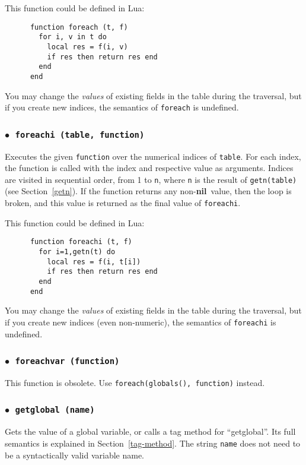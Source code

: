\documentclass[11pt]{article}
\newcommand{\See}[1]{Section~\ref{#1}}
\newcommand{\see}[1]{(see \See{#1})}
\newcommand{\T}[1]{{\tt #1}}
\newcommand{\nil}{{\bf nil}}
\newcommand{\Deffunc}[1]{\index{#1}}
\newcommand{\ff}{$\bullet$\ }
\begin{document}
This function could be defined in Lua:
\begin{verbatim}
      function foreach (t, f)
        for i, v in t do
          local res = f(i, v)
          if res then return res end
        end
      end
\end{verbatim}

You may change the \emph{values} of existing
fields in the table during the traversal,
but if you create new indices,
the semantics of \verb|foreach| is undefined.


\subsubsection*{\ff \T{foreachi (table, function)}}\Deffunc{foreachi}
Executes the given \verb|function| over the
numerical indices of \verb|table|.
For each index, the function is called with the index and
respective value as arguments.
Indices are visited in sequential order,
from 1 to \verb|n|,
where \verb|n| is the result of \verb|getn(table)| \see{getn}.
If the function returns any non-\nil\ value,
then the loop is broken, and this value is returned
as the final value of \verb|foreachi|.

This function could be defined in Lua:
\begin{verbatim}
      function foreachi (t, f)
        for i=1,getn(t) do
          local res = f(i, t[i])
          if res then return res end
        end
      end
\end{verbatim}

You may change the \emph{values} of existing fields in the
table during the traversal,
but if you create new indices (even non-numeric),
the semantics of \verb|foreachi| is undefined.

\subsubsection*{\ff \T{foreachvar (function)}}\Deffunc{foreachvar}
This function is obsolete.
Use \verb|foreach(globals(), function)| instead.


\subsubsection*{\ff \T{getglobal (name)}}\Deffunc{getglobal}
Gets the value of a global variable,
or calls a tag method for ``getglobal''.
Its full semantics is explained in \See{tag-method}.
The string \verb|name| does not need to be a
syntactically valid variable name.
\end{document}

